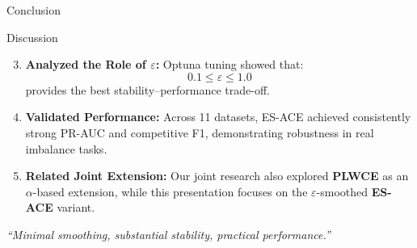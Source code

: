 \documentclass[aspectratio=169]{beamer}
\renewcommand{\textbf}[1]{\textcolor{SejongBlue}{\sf\bfseries #1}}
\begin{document}
\begin{frame}{Conclusion}
\small
\vspace{-1em}
\begin{mybox}{Discussion} %

\begin{enumerate}
\setcounter{enumi}{2}

\item \textbf{Analyzed the Role of $\varepsilon$:}
Optuna tuning showed that:
\[
0.1 \le \varepsilon \le 1.0
\]
provides the best stability–performance trade-off.

\vspace{0.4em}

\item \textbf{Validated Performance:}
Across 11 datasets, ES-ACE achieved consistently strong PR-AUC
and competitive F1, demonstrating robustness in real imbalance tasks.

\vspace{0.4em}

\item \textbf{Related Joint Extension:}
Our joint research also explored \textbf{PLWCE} as an $\alpha$-based extension,
while this presentation focuses on the $\varepsilon$-smoothed \textbf{ES-ACE} variant.

\end{enumerate}

\end{mybox}

\vspace{0.6em}
\centering
{\large \textit{“Minimal smoothing, substantial stability, practical performance.”}}

\end{frame}
\end{document}
